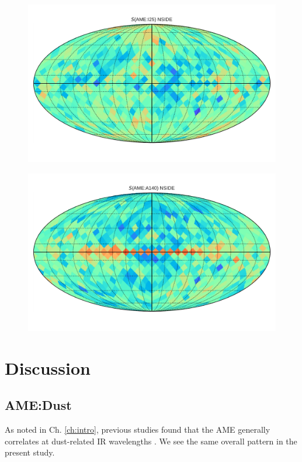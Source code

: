         \begin{figure}
         \includegraphics[width=\textwidth]{../Plots/Allsky_Corr/RadNorm/Spearman_Map_nside8_AMEtoI25.pdf}
         \centering
         \caption{}
         \label{fig:Spearman_Map_nside8_AMEtoIR_radnorm_I25}
      \end{figure}
        \begin{figure}
        \includegraphics[width=\textwidth]{../Plots/Allsky_Corr/RadNorm/Spearman_Map_nside8_AMEtoA140.pdf}
        \centering
        \caption{}
        \label{fig:Spearman_Map_nside8_AMEtoIR_radnorm_A140}
        \end{figure}


    \section{Discussion}
      \subsection{AME:Dust}
        As noted in Ch. \hyperref[ch:intro]{\ref{ch:intro}}, previous studies found that the AME generally correlates at dust-related IR wavelengths \citep{ysard10b,planckXV, hensley16}. We see the same overall pattern in the present study.


